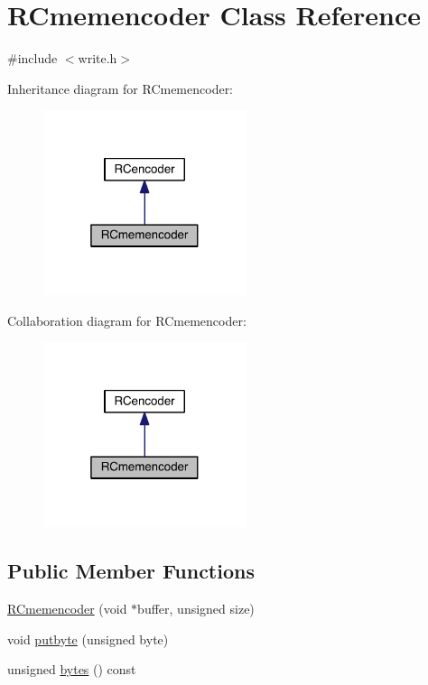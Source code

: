 \hypertarget{class_r_cmemencoder}{}\section{R\+Cmemencoder Class Reference}
\label{class_r_cmemencoder}


{\ttfamily \#include $<$write.\+h$>$}



Inheritance diagram for R\+Cmemencoder\+:\nopagebreak
\begin{figure}[H]
\begin{center}
\leavevmode
\includegraphics[width=169pt]{da/d5f/class_r_cmemencoder__inherit__graph}
\end{center}
\end{figure}


Collaboration diagram for R\+Cmemencoder\+:\nopagebreak
\begin{figure}[H]
\begin{center}
\leavevmode
\includegraphics[width=169pt]{dd/d53/class_r_cmemencoder__coll__graph}
\end{center}
\end{figure}
\subsection*{Public Member Functions}
\begin{DoxyCompactItemize}
\item 
\hyperlink{class_r_cmemencoder_a0531b24540cd2c898c58b5991a51f69d}{R\+Cmemencoder} (void $\ast$buffer, unsigned size)
\item 
void \hyperlink{class_r_cmemencoder_a94ecb262af34bb29d70e32ada7ea4f1d}{putbyte} (unsigned byte)
\item 
unsigned \hyperlink{class_r_cmemencoder_a7d4f0df9acacecc665fae61da49f2420}{bytes} () const 
\end{DoxyCompactItemize}
